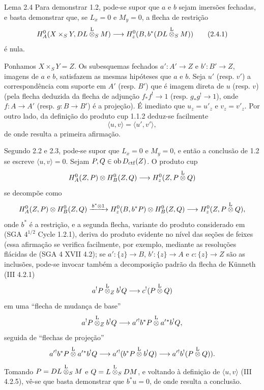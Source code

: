 \begin{statement}{Lema 2.4}
Para demonstrar 1.2, pode-se supor que $a$ e $b$ sejam imersões fechadas, e basta demonstrar que, se $L_x=0$ e $M_y=0$, a flecha de restrição
\begin{equation}
H_A^0(X\times_SY,DL\overset{\mathrm L}{\otimes}_SM)
 \longrightarrow H_z^0(B,b^*(DL\overset{\mathrm L}{\otimes}_SM))
\tag{2.4.1}
\end{equation}
é nula.
\end{statement}

Ponhamos $X\times_SY=Z$. Os subesquemas fechados $a':A'\to Z$ e $b':B'\to Z$, imagens de $a$ e $b$, satisfazem as mesmas hipóteses que $a$ e $b$. Seja $u'$ (resp. $v'$) a correspondência com suporte em $A'$ (resp. $B'$) que é imagem direta de $u$ (resp. $v$) (pela flecha deduzida da flecha de adjunção $f_*f^!\to 1$ (resp. $g_*g^!\to 1$), onde $f:A\to A'$ (resp. $g:B\to B'$) é a projeção). É imediato que $u_z=u'_z$ e $v_z=v'_z$. Por outro lado, da definição do produto cup 1.1.2 deduz-se facilmente
\[
\langle u,v\rangle=\langle u',v'\rangle,
\]
de onde resulta a primeira afirmação.

Segundo 2.2 e 2.3, pode-se supor que $L_x=0$ e $M_y=0$, e então a conclusão de 1.2 se escreve $\langle u,v\rangle=0$. Sejam $P,Q\in\operatorname{ob} D_{\mathrm{ctf}}(Z)$. O produto cup
\[
H_A^0(Z,P)\otimes H_B^0(Z,Q)\longrightarrow H_z^0(Z,P\overset{\mathrm L}{\otimes} Q)
\]
se decompõe como
\[
H_A^0(Z,P)\otimes H_B^0(Z,Q)
 \xrightarrow{\,b^*\otimes 1\,}
H_z^0(B,b^*P)\otimes H_B^0(Z,Q)
 \longrightarrow H_z^0(Z,P\overset{\mathrm L}{\otimes} Q),
\]
onde $b^*$ é a restrição, e a segunda flecha, variante do produto considerado em (SGA $4^{1/2}$ Cycle 1.2.1), deriva do produto evidente no nível das seções de feixes (essa afirmação se verifica facilmente, por exemplo, mediante as resoluções flácidas de (SGA 4 XVII 4.2); se $a':\{z\}\to B$, $b':\{z\}\to A$ e $c:\{z\}\to Z$ são as inclusões, pode-se invocar também a decomposição padrão da flecha de Künneth (III 4.2.1)
\[
a^!P\overset{\mathrm L}{\otimes}_Z b^!Q\longrightarrow c^!(P\overset{\mathrm L}{\otimes} Q)
\]
em uma ``flecha de mudança de base''
\[
a^!P\overset{\mathrm L}{\otimes}_Z b^!Q\longrightarrow a'{}^!b^*P\overset{\mathrm L}{\otimes} a'{}^*b^!Q,
\]
seguida de ``flechas de projeção''
\[
a'{}^!b^*P\overset{\mathrm L}{\otimes} a'{}^*b^!Q
 \longrightarrow a'{}^!(b^*P\overset{\mathrm L}{\otimes} b^!Q)
 \longrightarrow a'{}^!b^!(P\overset{\mathrm L}{\otimes} Q)).
\]
Tomando $P=DL\overset{\mathrm L}{\otimes}_SM$ e $Q=L\overset{\mathrm L}{\otimes}_SDM$, e voltando à definição de $\langle u,v\rangle$ (III 4.2.5), vê-se que basta demonstrar que $b^*u=0$, de onde resulta a conclusão.
